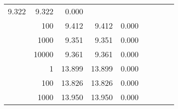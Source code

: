\begin{table}
\begin{tabular}{rrrrrrrrr}
						
							    
							    
	                           9.322 & 9.322 & 0.000  \\
	                
	            
					 &  
					 
					\multirow{ 1 }{*}{ 100 } &
					
						
							    
							    
	                           9.412 & 9.412 & 0.000  \\
	                
	            
					 &  
					 
					\multirow{ 1 }{*}{ 1000 } &
					
						
							    
							    
	                           9.351 & 9.351 & 0.000  \\
	                
	            
					 &  
					 
					\multirow{ 1 }{*}{ 10000 } &
					
						
							    
							    
	                           9.361 & 9.361 & 0.000  \\
	                
	            
	        
				\noalign{\smallskip}\hline
				\multirow{ 4 }{*}{ 1000000 } &
				
					
					 
					\multirow{ 1 }{*}{ 1 } &
					
						
							    
							    
	                           13.899 & 13.899 & 0.000  \\
	                
	            
					 &  
					 
					\multirow{ 1 }{*}{ 100 } &
					
						
							    
							    
	                           13.826 & 13.826 & 0.000  \\
	                
	            
					 &  
					 
					\multirow{ 1 }{*}{ 1000 } &
					
						
							    
							    
	                           13.950 & 13.950 & 0.000  \\
	                

\end{tabular}
\end{table}
